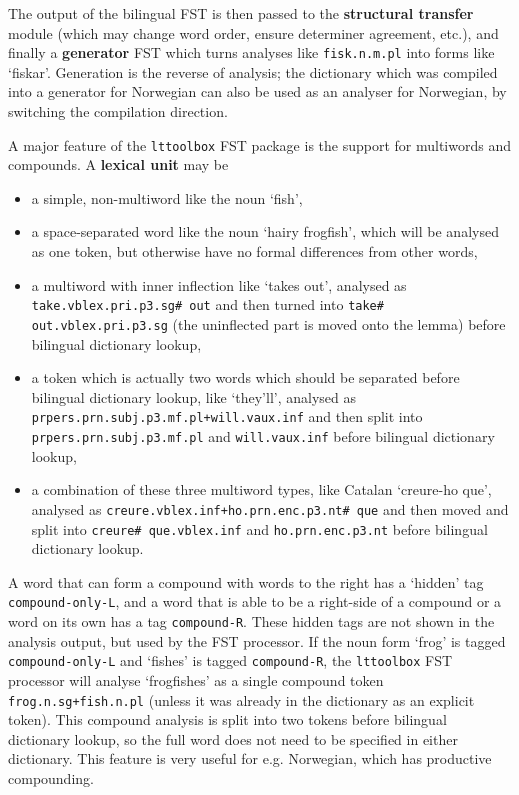 \documentclass[10pt, a4paper]{article}
\newcommand{\ana}[1]{\texttt{#1}}
\newcommand{\f}[1]{`#1'}
\newcommand{\tool}[1]{\texttt{#1}}
\begin{document}
The output of the bilingual FST is then passed to the
\textbf{structural transfer} module (which may change word order,
ensure determiner agreement, etc.), and finally a \textbf{generator}
FST which turns analyses like \ana{fisk.n.m.pl} into forms like
\f{fiskar}. Generation is the reverse of analysis; the dictionary
which was compiled into a generator for Norwegian can also be used as
an analyser for Norwegian, by switching the compilation direction.

A major feature of the \tool{lttoolbox} FST package is the support
for multiwords and compounds. A \textbf{lexical unit} may be 
\begin{itemize}
\item a simple, non-multiword like the noun \f{fish},
\item a space-separated word like the noun \f{hairy frogfish}, which
  will be analysed as one token, but otherwise have no formal
  differences from other words,
\item a multiword with inner inflection like \f{takes out}, analysed
  as \ana{take.vblex.pri.p3.sg\# out} and then turned into \ana{take\#
    out.vblex.pri.p3.sg} (the uninflected part is moved onto the
  lemma) before bilingual dictionary lookup,
\item a token which is actually two words which should be separated
  before bilingual dictionary lookup, like \f{they'll}, analysed as
  \ana{prpers.prn.subj.p3.mf.pl+will.vaux.inf} and then split into
  \ana{prpers.prn.subj.p3.mf.pl} and \ana{will.vaux.inf} before
  bilingual dictionary lookup,
\item a combination of these three multiword types, like Catalan
  \f{creure-ho que}, analysed as
  \ana{creure.vblex.inf+ho.prn.enc.p3.nt\# que} and then moved
  and split into \ana{creure\# que.vblex.inf} and
  \ana{ho.prn.enc.p3.nt} before bilingual dictionary lookup.
\end{itemize}


A word that can form a compound with words to the right has a
\f{hidden} tag \ana{compound-only-L}, and a word that is able to be a
right-side of a compound or a word on its own has a tag
\ana{compound-R}.  These hidden tags are not shown in the analysis
output, but used by the FST processor. If the noun form \f{frog} is
tagged \ana{compound-only-L} and \f{fishes} is tagged
\ana{compound-R}, the \tool{lttoolbox} FST processor will analyse
\f{frogfishes} as a single compound token \ana{frog.n.sg+fish.n.pl}
(unless it was already in the dictionary as an explicit token). This
compound analysis is split into two tokens before bilingual dictionary
lookup, so the full word does not need to be specified in either
dictionary. This feature is very useful for e.g. Norwegian, which has
productive compounding.
\end{document}
